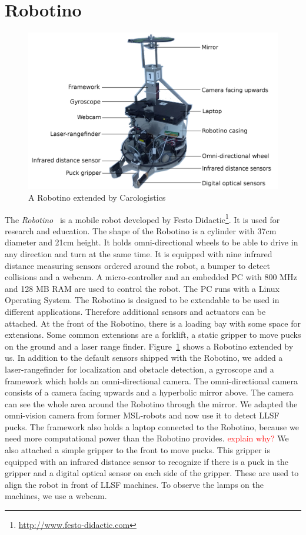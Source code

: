 \section{Robotino}
\label{sec:robotino}
\begin{figure}
\includegraphics[scale=0.11]{pics/carologistics_robotino}
\caption{A Robotino extended by Carologistics}
\label{fig:caro_robotino}
\end{figure}
The \textit{Robotino}~\cite{Robotino} is a mobile robot developed by Festo Didactic\footnote{\url{http://www.festo-didactic.com}}. It is used for research and education. The shape of the Robotino is a cylinder with 37cm diameter and 21cm height. It holds omni-directional wheels to be able to drive in any direction and turn at the same time. It is equipped with nine infrared distance measuring sensors ordered around the robot, a bumper to detect collisions and a webcam. A micro-controller and an embedded PC with 800 MHz and 128 MB RAM are used to control the robot. The PC runs with a Linux Operating System. The Robotino is designed to be extendable to be used in different applications. Therefore additional sensors and actuators can be attached. At the front of the Robotino, there is a loading bay with some space for extensions. Some common extensions are a forklift, a static gripper to move pucks on the ground and a laser range finder. Figure~\ref{fig:caro_robotino} shows a Robotino extended by us. In addition to the default sensors shipped with the Robotino, we added a laser-rangefinder for localization and obstacle detection, a gyroscope and a framework which holds an omni-directional camera. The omni-directional camera consists of a camera facing upwards and a hyperbolic mirror above. The camera can see the whole area around the Robotino through the mirror. We adapted the omni-vision camera from former MSL-robots and now use it to detect LLSF pucks. The framework also holds a laptop connected to the Robotino, because we need more computational power than the Robotino provides. \textcolor{red}{explain why?} We also attached a simple gripper to the front to move pucks. This gripper is equipped with an infrared distance sensor to recognize if there is a puck in the gripper and a digital optical sensor on each side of the gripper. These are used to align the robot in front of LLSF machines. To observe the lamps on the machines, we use a webcam.\\


